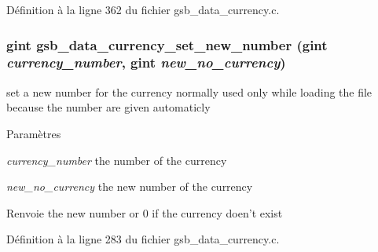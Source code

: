 Définition à la ligne 362 du fichier gsb\_\-data\_\-currency.c.

\subsubsection[{gsb\_\-data\_\-currency\_\-set\_\-new\_\-number}]{\setlength{\rightskip}{0pt plus 5cm}gint gsb\_\-data\_\-currency\_\-set\_\-new\_\-number (gint {\em currency\_\-number}, \/  gint {\em new\_\-no\_\-currency})}\label{gsb__data__currency_8h_a6a20f6117c3f5a7c86f276e98b37c0b6}
set a new number for the currency normally used only while loading the file because the number are given automaticly


\begin{DoxyParams}{Paramètres}
\item[{\em currency\_\-number}]the number of the currency \item[{\em new\_\-no\_\-currency}]the new number of the currency\end{DoxyParams}
\begin{DoxyReturn}{Renvoie}
the new number or 0 if the currency doen't exist 
\end{DoxyReturn}


Définition à la ligne 283 du fichier gsb\_\-data\_\-currency.c.

